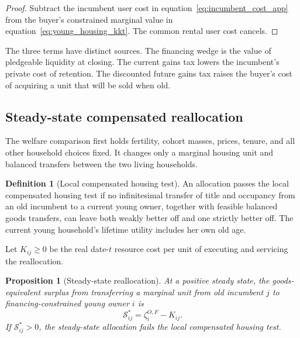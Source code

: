 \documentclass[11pt]{article}
\newtheorem{proposition}{Proposition}
\theoremstyle{definition}
\newtheorem{definition}{Definition}
\theoremstyle{remark}
\newcommand{\mcS}{\mathcal S}
\begin{document}
\begin{proof}
Subtract the incumbent user cost in equation~\eqref{eq:incumbent_cost_app} from
the buyer's constrained marginal value in
equation~\eqref{eq:young_housing_kkt}.  The common rental user cost cancels.
\end{proof}

The three terms have distinct sources.  The financing wedge is the value of
pledgeable liquidity at closing.  The current gains tax lowers the incumbent's
private cost of retention.  The discounted future gains tax raises the buyer's
cost of acquiring a unit that will be sold when old.

\subsection{Steady-state compensated reallocation}

The welfare comparison first holds fertility, cohort masses, prices, tenure,
and all other household choices fixed.  It changes only a marginal housing unit
and balanced transfers between the two living households.

\begin{definition}[Local compensated housing test]
An allocation passes the local compensated housing test if no infinitesimal
transfer of title and occupancy from an old incumbent to a current young owner,
together with feasible balanced goods transfers, can leave both weakly better
off and one strictly better off.  The current young household's lifetime utility
includes her own old age.
\end{definition}

Let $K_{ij}\geq0$ be the real date-$t$ resource cost per unit of executing and
servicing the reallocation.

\begin{proposition}[Steady-state reallocation]
At a positive steady state, the goods-equivalent surplus from transferring a
marginal unit from old incumbent $j$ to financing-constrained young owner $i$
is
\begin{equation}
 \mcS_{ij}^*=\zeta_i^{O,F}-K_{ij}.
 \label{eq:ss_surplus_app}
\end{equation}
If $\mcS_{ij}^*>0$, the steady-state allocation fails the local compensated
housing test.
\end{proposition}
\end{document}
